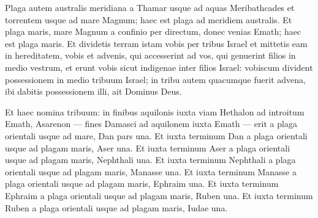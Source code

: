 \begin{biblechapter}
\begin{biblechapter}
\begin{biblechapter}
\begin{biblechapter}
\begin{biblechapter}
\begin{biblechapter}
\begin{biblechapter}
\begin{biblechapter}
\begin{biblechapter}
\begin{biblechapter}
\begin{biblechapter}
\begin{biblechapter}
\begin{biblechapter}
\begin{biblechapter}
\begin{biblechapter}
\begin{biblechapter}
\begin{biblechapter}
\begin{biblechapter}
\begin{biblechapter}
\begin{biblechapter}
\begin{biblechapter}
\begin{biblechapter}
\begin{biblechapter}
\begin{biblechapter}
\begin{biblechapter}
\begin{biblechapter}
\begin{biblechapter}
\begin{biblechapter}
\begin{biblechapter}
\begin{biblechapter}
\begin{biblechapter}
\begin{biblechapter}
\begin{biblechapter}
\begin{biblechapter}
\begin{biblechapter}
\begin{biblechapter}
\begin{biblechapter}
\begin{biblechapter}
\begin{biblechapter}
\begin{biblechapter}
\begin{biblechapter}
\begin{biblechapter}
\begin{biblechapter}
\begin{biblechapter}
\begin{biblechapter}
\begin{biblechapter}
\begin{biblechapter}
\verse Plaga autem australis meridiana a Thamar usque ad aquas Meribathcades et torrentem usque ad mare Magnum; haec est plaga ad meridiem australis. 
\verse Et plaga maris, mare Magnum a confinio per directum, donec venias Emath; haec est plaga maris. 
\verse Et dividetis terram istam vobis per tribus Israel 
\verse et mittetis eam in hereditatem, vobis et advenis, qui accesserint ad vos, qui genuerint filios in medio vestrum, et erunt vobis sicut indigenae inter filios Israel: vobiscum divident possessionem in medio tribuum Israel; 
\verse in tribu autem quacumque fuerit advena, ibi dabitis possessionem illi, ait Dominus Deus.
 
\begin{biblechapter}
\verse Et haec nomina tribuum: in finibus aquilonis iuxta viam Hethalon ad introitum Emath, Asarenon — fines Damasci ad aquilonem iuxta Emath — erit a plaga orientali usque ad mare, Dan pars una. 
\verse Et iuxta terminum Dan a plaga orientali usque ad plagam maris, Aser una. 
\verse Et iuxta terminum Aser a plaga orientali usque ad plagam maris, Nephthali una. 
\verse Et iuxta terminum Nephthali a plaga orientali usque ad plagam maris, Manasse una. 
\verse Et iuxta terminum Manasse a plaga orientali usque ad plagam maris, Ephraim una. 
\verse Et iuxta terminum Ephraim a plaga orientali usque ad plagam maris, Ruben una. 
\verse Et iuxta terminum Ruben a plaga orientali usque ad plagam maris, Iudae una. 

\end{biblechapter}
\end{biblechapter}
\end{biblechapter}
\end{biblechapter}
\end{biblechapter}
\end{biblechapter}
\end{biblechapter}
\end{biblechapter}
\end{biblechapter}
\end{biblechapter}
\end{biblechapter}
\end{biblechapter}
\end{biblechapter}
\end{biblechapter}
\end{biblechapter}
\end{biblechapter}
\end{biblechapter}
\end{biblechapter}
\end{biblechapter}
\end{biblechapter}
\end{biblechapter}
\end{biblechapter}
\end{biblechapter}
\end{biblechapter}
\end{biblechapter}
\end{biblechapter}
\end{biblechapter}
\end{biblechapter}
\end{biblechapter}
\end{biblechapter}
\end{biblechapter}
\end{biblechapter}
\end{biblechapter}
\end{biblechapter}
\end{biblechapter}
\end{biblechapter}
\end{biblechapter}
\end{biblechapter}
\end{biblechapter}
\end{biblechapter}
\end{biblechapter}
\end{biblechapter}
\end{biblechapter}
\end{biblechapter}
\end{biblechapter}
\end{biblechapter}
\end{biblechapter}
\end{biblechapter}
